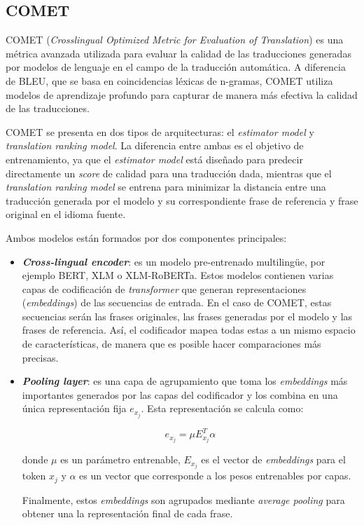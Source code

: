 \documentclass[11pt,spanish,listoffigures,listoftables]{tfgetsinf}
\begin{document}
\subsection{COMET}

COMET (\textit{Crosslingual Optimized Metric for Evaluation of Translation}) \cite{rei2020cometneuralframeworkmt} es una métrica avanzada utilizada para evaluar la calidad de las traducciones generadas por modelos de lenguaje en el campo de la traducción automática. A diferencia de BLEU, que se basa en coincidencias léxicas de n-gramas, COMET utiliza modelos de aprendizaje profundo para capturar de manera más efectiva la calidad de las traducciones.

COMET se presenta en dos tipos de arquitecturas: el \textit{estimator model} y \textit{translation ranking model}. La diferencia entre ambas es el objetivo de entrenamiento, ya que el \textit{estimator model} está diseñado para predecir directamente un \textit{score} de calidad para una traducción dada, mientras que el \textit{translation ranking model} se entrena para minimizar la distancia entre una traducción generada por el modelo y su correspondiente frase de referencia y frase original en el idioma fuente.

Ambos modelos están formados por dos componentes principales:

\begin{itemize}
	\item \textbf{\textit{Cross-lingual encoder}}: es un modelo pre-entrenado multilingüe, por ejemplo BERT, XLM o XLM-RoBERTa. Estos modelos contienen varias capas de codificación de \textit{transformer} que generan representaciones (\textit{embeddings}) de las secuencias de entrada. En el caso de COMET, estas secuencias serán las frases originales, las frases generadas por el modelo y las frases de referencia. Así, el codificador mapea todas estas a un mismo espacio de características, de manera que es posible hacer comparaciones más precisas.
	\item \textbf{\textit{Pooling layer}}: es una capa de agrupamiento que toma los \textit{embeddings} más importantes generados por las capas del codificador y los combina en una única representación fija $e_{x_j}$. Esta representación se calcula como:

\begin{equation}
e_{x_j} = \mu E_{x_j}^T \alpha
\end{equation}

donde $\mu$ es un parámetro entrenable, $E_{x_j}$ es el vector de \textit{embeddings} para el token $x_j$ y $\alpha$ es un vector que corresponde a los pesos entrenables por capas.

Finalmente, estos \textit{embeddings} son agrupados mediante \textit{average pooling} para obtener una la representación final de cada frase.
\end{itemize}
\end{document}
